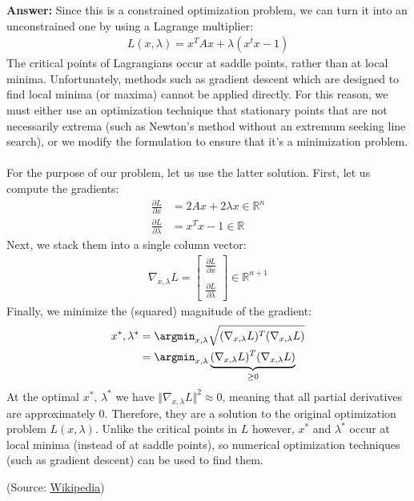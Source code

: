 \documentclass{article}
\newenvironment{QandA}{\begin{enumerate}[label=\arabic*.]}{\end{enumerate}}
\newenvironment{answer}{\par\normalfont \textbf{Answer:}}{}
\newcommand{\R}{\mathbb{R}}
\begin{document}
\begin{QandA}
    \begin{answer}
        Since this is a constrained optimization problem, we can turn it into an unconstrained one by using a Lagrange multiplier:
        \begin{align*}
            L(x, \lambda) = x^T A x + \lambda (x^t x - 1) 
        \end{align*}
        The critical points of Lagrangians occur at saddle points, rather than at local minima. Unfortunately, methods such as gradient descent which are designed to find local minima (or maxima) cannot be applied directly. For this reason, we must either use an optimization technique that stationary points that are not necessarily extrema (such as Newton's method without an extremum seeking line search), or we modify the formulation to ensure that it's a minimization problem. \\\\
        For the purpose of our problem, let us use the latter solution. First, let us compute the gradients:
        \begin{align*}
            \frac{\partial L}{ \partial x} &= 2Ax + 2 \lambda x \in \R^n \\ 
            \frac{\partial L}{\partial \lambda} &= x^T x - 1 \in \R
        \end{align*}
        Next, we stack them into a single column vector:
        \begin{align*}
            \nabla_{x, \lambda}L = 
            \begin{bmatrix}
             \frac{\partial L}{\partial x} \\
             \\
             \frac{\partial L}{\partial \lambda}
            \end{bmatrix} \in \R^{n + 1}
        \end{align*}
        Finally, we minimize the (squared) magnitude of the gradient:
        \begin{align*}
            x^{*}, \lambda^{*} &= \argmin_{x, \lambda} \sqrt{(\nabla_{x, \lambda}L)^T (\nabla_{x, \lambda}L)} \\
             &= \argmin_{x, \lambda} \underbrace{(\nabla_{x, \lambda}L)^T (\nabla_{x, \lambda}L)}_{\ge 0}
        \end{align*}
        At the optimal $x^{*}$, $\lambda^{*}$ we have $ \Vert \nabla_{x, \lambda}L \Vert ^2 \approx 0$, meaning that all partial derivatives are approximately $0$. Therefore, they are a solution to the original optimization problem $L(x, \lambda)$. Unlike the critical points in $L$ however, $x^{*}$ and $\lambda^{*}$ occur at local minima (instead of at saddle points), so numerical optimization techniques (such as gradient descent) can be used to find them. 
        
        (Source: \href{https://en.wikipedia.org/wiki/Lagrange_multiplier#Examples}{Wikipedia})
    \end{answer}
\end{QandA}
\end{document}
